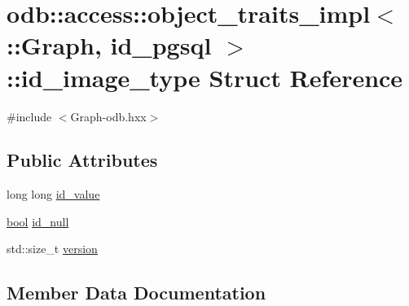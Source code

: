 \hypertarget{structodb_1_1access_1_1object__traits__impl_3_01_1_1_graph_00_01id__pgsql_01_4_1_1id__image__type}{}\section{odb\+:\+:access\+:\+:object\+\_\+traits\+\_\+impl$<$ \+:\+:Graph, id\+\_\+pgsql $>$\+:\+:id\+\_\+image\+\_\+type Struct Reference}
\label{structodb_1_1access_1_1object__traits__impl_3_01_1_1_graph_00_01id__pgsql_01_4_1_1id__image__type}


{\ttfamily \#include $<$Graph-\/odb.\+hxx$>$}

\subsection*{Public Attributes}
\begin{DoxyCompactItemize}
\item 
long long \hyperlink{structodb_1_1access_1_1object__traits__impl_3_01_1_1_graph_00_01id__pgsql_01_4_1_1id__image__type_ab0ca98f5c65daee4a2bc135a4f05ecc3}{id\+\_\+value}
\item 
\hyperlink{classodb_1_1access_1_1object__traits_3_01_1_1_graph_01_4_a2f6665ffbf77fb06f9a323ac98c30983}{bool} \hyperlink{structodb_1_1access_1_1object__traits__impl_3_01_1_1_graph_00_01id__pgsql_01_4_1_1id__image__type_ad9bdae837dd5163a09a544958ae63dd0}{id\+\_\+null}
\item 
std\+::size\+\_\+t \hyperlink{structodb_1_1access_1_1object__traits__impl_3_01_1_1_graph_00_01id__pgsql_01_4_1_1id__image__type_ad3512ef6b8dff321c164c322f94c795b}{version}
\end{DoxyCompactItemize}


\subsection{Member Data Documentation}
\hypertarget{structodb_1_1access_1_1object__traits__impl_3_01_1_1_graph_00_01id__pgsql_01_4_1_1id__image__type_ad9bdae837dd5163a09a544958ae63dd0}{}
